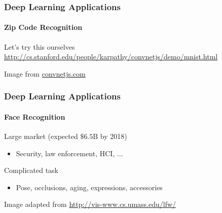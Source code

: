 \documentclass[xetex,professionalfont]{beamer}
\begin{document}

\begin{frame}
\frametitle{Deep Learning Applications}
\framesubtitle{Zip Code Recognition}

Let's try this ourselves\\\medskip
\url{http://cs.stanford.edu/people/karpathy/convnetjs/demo/mnist.html}

\bigskip
\begin{center}
    {\centering Image from \url{convnetjs.com}}
\end{center}

\end{frame}


\begin{frame}
\frametitle{Deep Learning Applications}
\framesubtitle{Face Recognition}

Large market (expected $\$6.5$B by 2018) %
\begin{itemize}
    \item Security, law enforcement, HCI, ...
\end{itemize}

\bigskip
Complicated task
\begin{itemize}
    \item Pose, occlusions, aging, expressions, accessories
\end{itemize}

\bigskip
\begin{center}
    {\centering Image adapted from \url{http://vis-www.cs.umass.edu/lfw/}}
\end{center}

\end{frame}
\end{document}
